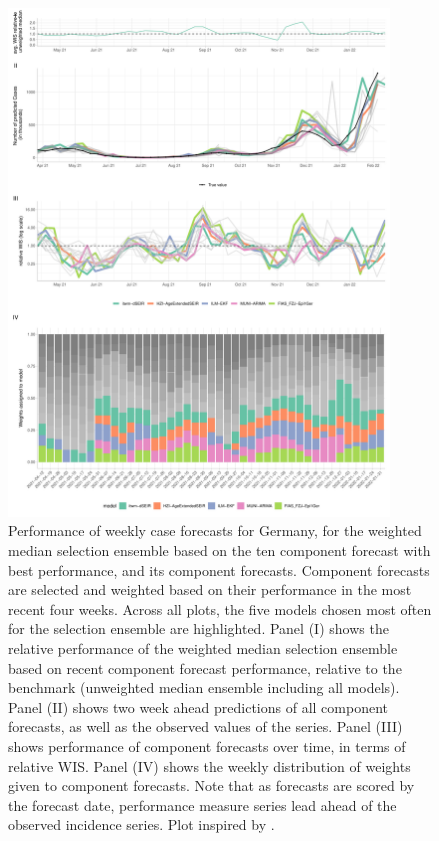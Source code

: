 \begin{figure}
\centering
\includegraphics[width = 0.9\textwidth]{../plots/best_performers_weights_de}
\caption{\footnotesize{Performance of weekly case forecasts for Germany, for the weighted median selection ensemble based on the ten component forecast with best performance, and its component forecasts. Component forecasts are selected and weighted based on their performance in the most recent four weeks. Across all plots, the five models chosen most often for the selection ensemble are highlighted. Panel (I) shows the relative performance of the weighted median selection ensemble based on recent component forecast performance, relative to the benchmark (unweighted median ensemble including all models). Panel (II) shows two week ahead predictions of all component forecasts, as well as the observed values of the series. Panel (III) shows performance of component forecasts over time, in terms of relative WIS. Panel (IV) shows the weekly distribution of weights given to component forecasts. Note that as forecasts are scored by the forecast date, performance measure series lead ahead of the observed incidence series. Plot inspired by \cite{ray_comparing_2022}.}}
\label{fig:bpweights_de}
\end{figure}\\
